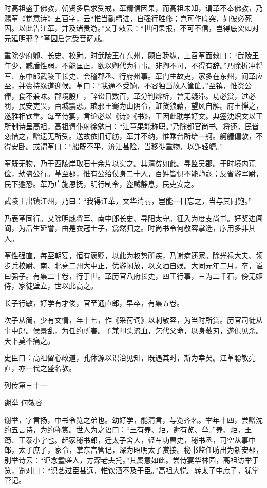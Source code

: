 \documentclass[12pt,UTF8]{ctexbook}
\begin{document}
时高祖盛于佛教，朝贤多启求受戒，革精信因果，而高祖未知，谓革不奉佛教，乃赐革《觉意诗》五百字，云“惟当勤精进，自强行胜修；岂可作底突，如彼必死囚。以此告江革，并及诸贵游。”又手敕云：“世间果报，不可不信，岂得底突如对元延明邪？”革因启乞受菩萨戒。

重除少府卿、长史、校尉。时武陵王在东州，颇自骄纵，上召革面敕曰：“武陵王年少，臧盾性弱，不能匡正，欲以卿代为行事。非卿不可，不得有辞。”乃除折冲将军、东中郎武陵王长史、会稽郡丞、行府州事。革门生故吏，家多在东州，闻革应至，并赍持缘道迎候。革曰：“我通不受饷，不容独当故人筐篚。”至镇，惟资公俸，食不兼味。郡境殷广，辞讼日数百，革分判辨析，曾无疑滞。功必赏，过必罚，民安吏畏，百城震恐。琅邪王骞为山阴令，赃货狼藉，望风自解。府王惮之，遂雅相钦重。每至侍宴，言论必以《诗》《书》，王因此耽学好文。典签沈炽文以王所制诗呈高祖，高祖谓仆射徐勉曰：“江革果能称职。”乃除都官尚书。将还，民皆恋惜之，赠遗无所受。送故依旧订舫，革并不纳，惟乘台所给一舸。舸艚偏欹，不得安卧。或谓革曰：“船既不平，济江甚险，当移徙重物，以迮轻艚。”

革既无物，乃于西陵岸取石十余片以实之。其清贫如此。寻监吴郡。于时境内荒俭，劫盗公行。革至郡，惟有公给仗身二十人，百姓皆惧不能静寇；反省游军尉，民下逾恐。革乃广施恩抚，明行制令，盗贼静息，民吏安之。

武陵王出镇江州，乃曰：“我得江革，文华清丽，岂能一日忘之，当与其同饱。”

乃表革同行。又除明威将军、南中郎长史、寻阳太守。征入为度支尚书。好奖进闾阎，为后生延誉，由是衣冠士子，翕然归之。时尚书令何敬容掌选，序用多非其人。

革性强直，每至朝宴，恒有褒贬，以此为权势所疾，乃谢病还家。除光禄大夫、领步兵校尉、南、北兗二州大中正，优游闲放，以文酒自娱。大同元年二月，卒，谥曰强子。有集二十卷，行于世。革历官八府长史，四王行事，三为二千石，傍无姬侍，家徒壁立，世以此高之。

长子行敏，好学有才俊，官至通直郎，早卒，有集五卷。

次子从简，少有文情，年十七，作《采荷词》以刺敬容，为当时所赏。历官司徒从事中郎。侯景乱，为任约所害。子兼叩头流血，乞代父命，以身蔽刃，遂俱见杀。天下莫不痛之。

史臣曰：高祖留心政道，孔休源以识治见知，既遇其时，斯为幸矣。江革聪敏亮直，亦一代之盛名欤。





列传第三十一

谢举 何敬容

谢举，字言扬，中书令览之弟也。幼好学，能清言，与览齐名。举年十四，尝赠沈约五言诗，为约称赏。世人为之语曰：“王有养、炬，谢有览、举。”养、炬，王筠、王泰小字也。起家秘书郎，迁太子舍人，轻车功曹史，秘书丞，司空从事中郎，太子庶子，家令，掌东宫管记，深为昭明太子赏接。秘书监任昉出为新安郡，别举诗云：“讵念耋嗟人，方深老夫托。”其属意如此。尝侍宴华林园，高祖访举于览，览对曰：“识艺过臣甚远，惟饮酒不及于臣。”高祖大悦。转太子中庶子，犹掌管记。
\end{document}

